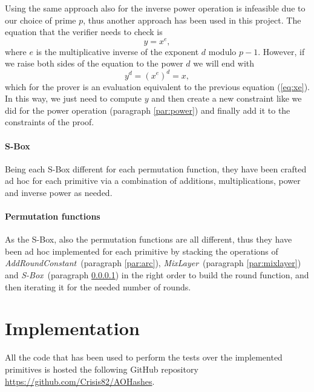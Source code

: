 \documentclass[12pt, a4paper]{report}
\begin{document}
Using the same approach also for the inverse power operation is infeasible due to our choice of prime $p$, thus another approach has been used in this project.
The equation that the verifier needs to check is
\begin{equation}
  y = x^e ,
  \label{eq:xe}
\end{equation}
where $e$ is the multiplicative inverse of the exponent $d$ modulo $p-1$.
However, if we raise both sides of the equation to the power $d$ we will end with
\begin{equation}
  y^d = (x^e)^d = x ,
  \label{eq:xed}
\end{equation}
which for the prover is an evaluation equivalent to the previous equation (\ref{eq:xe}).
In this way, we just need to compute $y$ and then create a new constraint like we did for the power operation (paragraph \ref{par:power}) and finally add it to the constraints of the proof.

\paragraph{S-Box}\label{par:sbox}

Being each S-Box different for each permutation function, they have been crafted ad hoc for each primitive via a combination of additions, multiplications, power and inverse power as needed.

\paragraph{Permutation functions}

As the S-Box, also the permutation functions are all different, thus they have been ad hoc implemented for each primitive by stacking the operations of \textit{AddRoundConstant}~(paragraph \ref{par:arc}), \textit{MixLayer}~(paragraph \ref{par:mixlayer}) and \textit{S-Box}~(paragraph \ref{par:sbox}) in the right order to build the round function, and then iterating it for the needed number of rounds.

\section{Implementation}\label{sec:implementation}

All the code that has been used to perform the tests over the implemented primitives is hosted the following GitHub repository \url{https://github.com/Crisis82/AOHashes}.
\end{document}
